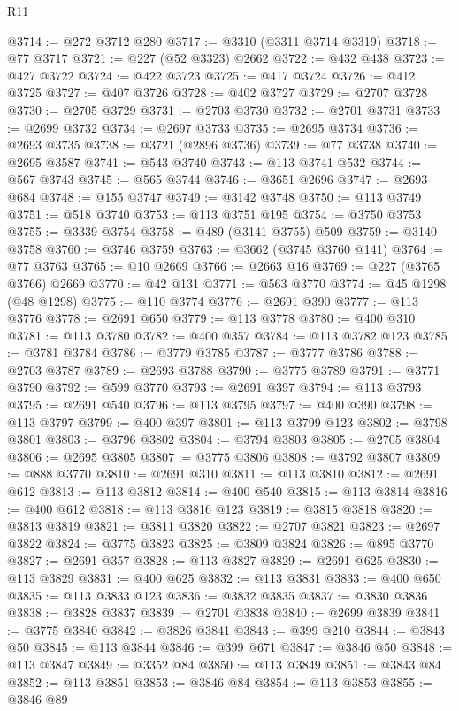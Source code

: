 \begin{lexlean}{R11}
\begin{coremodule}
{{{{{{{{{{{{{{{{{{{{{{{{{{{{{{{{{{{{{{{{{{{{{{{{{{{{{{{{{{{{{{{{{{{{{{{{{{{{{{{{{{{{{{{{{{{{{{{{{{{{{{{{{{@3714 := @272 @3712 @280
@3717 := @3310 (@3311 @3714 @3319)
@3718 := @77 @3717
@3721 := @227 (@52 @3323) @2662
@3722 := @432 @438
@3723 := @427 @3722
@3724 := @422 @3723
@3725 := @417 @3724
@3726 := @412 @3725
@3727 := @407 @3726
@3728 := @402 @3727
@3729 := @2707 @3728
@3730 := @2705 @3729
@3731 := @2703 @3730
@3732 := @2701 @3731
@3733 := @2699 @3732
@3734 := @2697 @3733
@3735 := @2695 @3734
@3736 := @2693 @3735
@3738 := @3721 (@2896 @3736)
@3739 := @77 @3738
@3740 := @2695 @3587
@3741 := @543 @3740
@3743 := @113 @3741 @532
@3744 := @567 @3743
@3745 := @565 @3744
@3746 := @3651 @2696
@3747 := @2693 @684
@3748 := @155 @3747
@3749 := @3142 @3748
@3750 := @113 @3749
@3751 := @518 @3740
@3753 := @113 @3751 @195
@3754 := @3750 @3753
@3755 := @3339 @3754
@3758 := @489 (@3141 @3755) @509
@3759 := @3140 @3758
@3760 := @3746 @3759
@3763 := @3662 (@3745 @3760 @141)
@3764 := @77 @3763
@3765 := @10 @2669
@3766 := @2663 @16
@3769 := @227 (@3765 @3766) @2669
@3770 := @42 @131
@3771 := @563 @3770
@3774 := @45 @1298 (@48 @1298)
@3775 := @110 @3774
@3776 := @2691 @390
@3777 := @113 @3776
@3778 := @2691 @650
@3779 := @113 @3778
@3780 := @400 @310
@3781 := @113 @3780
@3782 := @400 @357
@3784 := @113 @3782 @123
@3785 := @3781 @3784
@3786 := @3779 @3785
@3787 := @3777 @3786
@3788 := @2703 @3787
@3789 := @2693 @3788
@3790 := @3775 @3789
@3791 := @3771 @3790
@3792 := @599 @3770
@3793 := @2691 @397
@3794 := @113 @3793
@3795 := @2691 @540
@3796 := @113 @3795
@3797 := @400 @390
@3798 := @113 @3797
@3799 := @400 @397
@3801 := @113 @3799 @123
@3802 := @3798 @3801
@3803 := @3796 @3802
@3804 := @3794 @3803
@3805 := @2705 @3804
@3806 := @2695 @3805
@3807 := @3775 @3806
@3808 := @3792 @3807
@3809 := @888 @3770
@3810 := @2691 @310
@3811 := @113 @3810
@3812 := @2691 @612
@3813 := @113 @3812
@3814 := @400 @540
@3815 := @113 @3814
@3816 := @400 @612
@3818 := @113 @3816 @123
@3819 := @3815 @3818
@3820 := @3813 @3819
@3821 := @3811 @3820
@3822 := @2707 @3821
@3823 := @2697 @3822
@3824 := @3775 @3823
@3825 := @3809 @3824
@3826 := @895 @3770
@3827 := @2691 @357
@3828 := @113 @3827
@3829 := @2691 @625
@3830 := @113 @3829
@3831 := @400 @625
@3832 := @113 @3831
@3833 := @400 @650
@3835 := @113 @3833 @123
@3836 := @3832 @3835
@3837 := @3830 @3836
@3838 := @3828 @3837
@3839 := @2701 @3838
@3840 := @2699 @3839
@3841 := @3775 @3840
@3842 := @3826 @3841
@3843 := @399 @210
@3844 := @3843 @50
@3845 := @113 @3844
@3846 := @399 @671
@3847 := @3846 @50
@3848 := @113 @3847
@3849 := @3352 @84
@3850 := @113 @3849
@3851 := @3843 @84
@3852 := @113 @3851
@3853 := @3846 @84
@3854 := @113 @3853
@3855 := @3846 @89
}}}}}}}}}}}}}}}}}}}}}}}}}}}}}}}}}}}}}}}}}}}}}}}}}}}}}}}}}}}}}}}}}}}}}}}}}}}}}}}}}}}}}}}}}}}}}}}}}}}}}}}}}}
\end{coremodule}
\end{lexlean}

